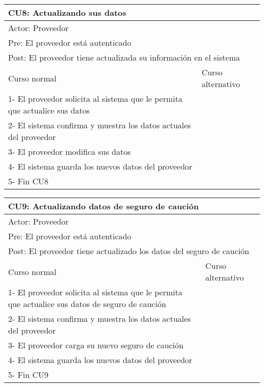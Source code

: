 \begin{table}[H]
  \begin{adjustbox}{max width = \textwidth}
  \begin{tabular}{|l|l|}
    \hline
    \multicolumn{2}{|l|}{CU8: Actualizando sus datos} \\\hline
    \multicolumn{2}{|l|}{Actor: Proveedor} \\\hline
    \multicolumn{2}{|l|}{Pre: El proveedor está autenticado} \\\hline
    \multicolumn{2}{|l|}{Post: El proveedor tiene actualizada su información en el sistema} \\\hline
     Curso normal & Curso alternativo\\ \hline
     1- El proveedor solicita al sistema que le permita que actualice sus datos & \\ \hline
     2- El sistema confirma y muestra los datos actuales del proveedor & \\ \hline
     3- El proveedor modifica sus datos &\\ \hline
     4- El sistema guarda los nuevos datos del proveedor & \\ \hline
     5- Fin CU8 & \\ \hline
  \end{tabular}
  \end{adjustbox}
\end{table}

\begin{table}[H]
  \begin{adjustbox}{max width = \textwidth}
  \begin{tabular}{|l|l|}
    \hline
    \multicolumn{2}{|l|}{CU9: Actualizando datos de seguro de caución} \\\hline
    \multicolumn{2}{|l|}{Actor: Proveedor} \\\hline
    \multicolumn{2}{|l|}{Pre: El proveedor está autenticado} \\\hline
    \multicolumn{2}{|l|}{Post: El proveedor tiene actualizado los datos del seguro de caución} \\\hline
     Curso normal & Curso alternativo\\ \hline
     1- El proveedor solicita al sistema que le permita que actualice sus datos de seguro de caución & \\ \hline
     2- El sistema confirma y muestra los datos actuales del proveedor & \\ \hline
     3- El proveedor carga su nuevo seguro de caución &\\ \hline
     4- El sistema guarda los nuevos datos del proveedor & \\ \hline
     5- Fin CU9 & \\ \hline
  \end{tabular}
  \end{adjustbox}
\end{table}

